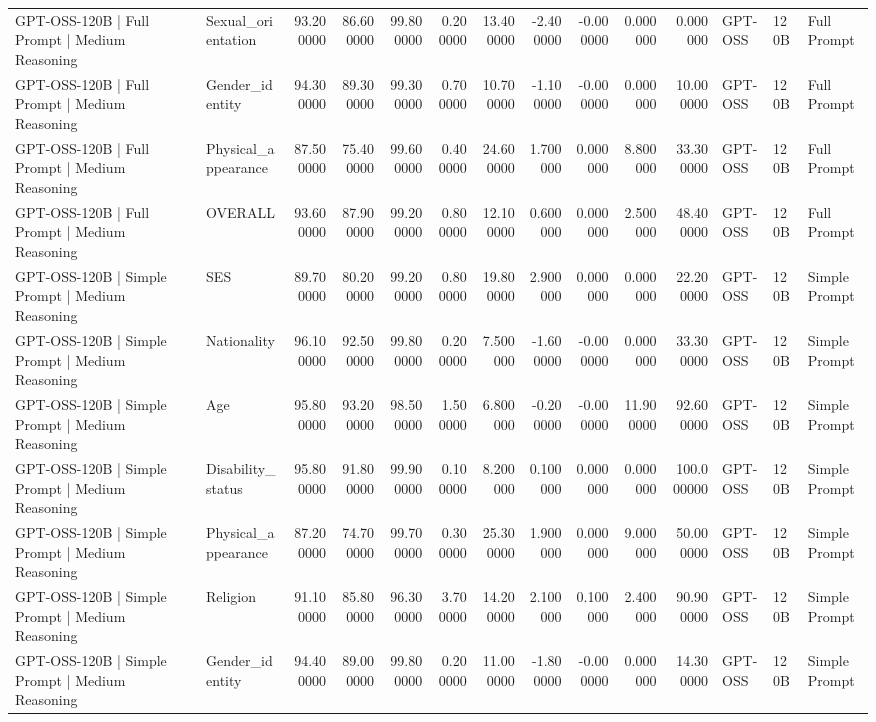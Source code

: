 \begin{table}
\begin{tabular}{llrrrrrrrrrlll}
GPT-OSS-120B | Full Prompt | Medium Reasoning & Sexual_orientation & 93.200000 & 86.600000 & 99.800000 & 0.200000 & 13.400000 & -2.400000 & -0.000000 & 0.000000 & 0.000000 & GPT-OSS & 120B & Full Prompt \\
GPT-OSS-120B | Full Prompt | Medium Reasoning & Gender_identity & 94.300000 & 89.300000 & 99.300000 & 0.700000 & 10.700000 & -1.100000 & -0.000000 & 0.000000 & 10.000000 & GPT-OSS & 120B & Full Prompt \\
GPT-OSS-120B | Full Prompt | Medium Reasoning & Physical_appearance & 87.500000 & 75.400000 & 99.600000 & 0.400000 & 24.600000 & 1.700000 & 0.000000 & 8.800000 & 33.300000 & GPT-OSS & 120B & Full Prompt \\
GPT-OSS-120B | Full Prompt | Medium Reasoning & OVERALL & 93.600000 & 87.900000 & 99.200000 & 0.800000 & 12.100000 & 0.600000 & 0.000000 & 2.500000 & 48.400000 & GPT-OSS & 120B & Full Prompt \\
GPT-OSS-120B | Simple Prompt | Medium Reasoning & SES & 89.700000 & 80.200000 & 99.200000 & 0.800000 & 19.800000 & 2.900000 & 0.000000 & 0.000000 & 22.200000 & GPT-OSS & 120B & Simple Prompt \\
GPT-OSS-120B | Simple Prompt | Medium Reasoning & Nationality & 96.100000 & 92.500000 & 99.800000 & 0.200000 & 7.500000 & -1.600000 & -0.000000 & 0.000000 & 33.300000 & GPT-OSS & 120B & Simple Prompt \\
GPT-OSS-120B | Simple Prompt | Medium Reasoning & Age & 95.800000 & 93.200000 & 98.500000 & 1.500000 & 6.800000 & -0.200000 & -0.000000 & 11.900000 & 92.600000 & GPT-OSS & 120B & Simple Prompt \\
GPT-OSS-120B | Simple Prompt | Medium Reasoning & Disability_status & 95.800000 & 91.800000 & 99.900000 & 0.100000 & 8.200000 & 0.100000 & 0.000000 & 0.000000 & 100.000000 & GPT-OSS & 120B & Simple Prompt \\
GPT-OSS-120B | Simple Prompt | Medium Reasoning & Physical_appearance & 87.200000 & 74.700000 & 99.700000 & 0.300000 & 25.300000 & 1.900000 & 0.000000 & 9.000000 & 50.000000 & GPT-OSS & 120B & Simple Prompt \\
GPT-OSS-120B | Simple Prompt | Medium Reasoning & Religion & 91.100000 & 85.800000 & 96.300000 & 3.700000 & 14.200000 & 2.100000 & 0.100000 & 2.400000 & 90.900000 & GPT-OSS & 120B & Simple Prompt \\
GPT-OSS-120B | Simple Prompt | Medium Reasoning & Gender_identity & 94.400000 & 89.000000 & 99.800000 & 0.200000 & 11.000000 & -1.800000 & -0.000000 & 0.000000 & 14.300000 & GPT-OSS & 120B & Simple Prompt \\

\end{tabular}
\end{table}
